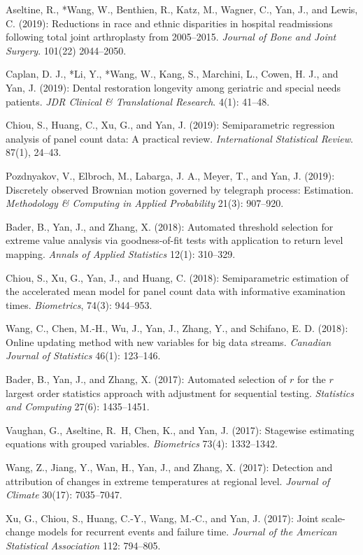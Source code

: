 \documentclass[Statistics]{vita}
\begin{document}
\begin{vita}
\begin{Publications}
\begin{RefereedJournalArticles}
  \item Aseltine, R., *Wang, W., Benthien, R., Katz, M., Wagner, C., Yan, J., and Lewis, C. (2019): Reductions in race and ethnic disparities in hospital readmissions following total joint arthroplasty from 2005--2015. {\em Journal of Bone and Joint Surgery\/}. 101(22) 2044--2050. 
 \item Caplan, D. J., *Li, Y., *Wang, W., Kang, S., Marchini, L., Cowen, H. J., and Yan, J. (2019): Dental restoration longevity among geriatric and special needs patients. {\em JDR Clinical \& Translational Research\/}. 4(1): 41--48.
  \item Chiou, S., Huang, C., Xu, G., and Yan, J. (2019): Semiparametric regression analysis of panel count data: A practical review. {\em International Statistical Review\/}. 87(1), 24--43.
  \item Pozdnyakov, V., Elbroch, M., Labarga, J. A., Meyer, T., and Yan, J. (2019): Discretely observed Brownian motion governed by telegraph process: Estimation. {\em Methodology \& Computing in Applied Probability\/} 21(3): 907--920.
  \item *Bader, B., Yan, J., and Zhang, X. (2018): Automated threshold selection for extreme value analysis via goodness-of-fit tests with application to return level mapping. {\em Annals of Applied Statistics\/} 12(1): 310--329.
  \item Chiou, S., Xu, G., Yan, J., and Huang, C. (2018): Semiparametric estimation of the accelerated mean model for panel count data with informative examination times. {\em Biometrics\/}, 74(3): 944--953.
  \item *Wang, C., Chen, M.-H., Wu, J., Yan, J., Zhang, Y., and Schifano, E. D. (2018): Online updating method with new variables for big data streams. {\em Canadian Journal of Statistics\/} 46(1): 123--146.
 \item *Bader, B., Yan, J., and Zhang, X. (2017): Automated selection of $r$ for the $r$ largest order statistics approach with adjustment for sequential testing. {\em Statistics and Computing\/} 27(6): 1435--1451.
  \item *Vaughan, G., Aseltine, R.~H, Chen, K., and Yan, J. (2017): Stagewise estimating equations with grouped variables. {\em Biometrics\/} 73(4): 1332--1342.
  \item *Wang, Z., Jiang, Y., Wan, H., Yan, J., and Zhang, X. (2017): Detection and attribution of changes in extreme temperatures at regional level.  {\em Journal of Climate\/} 30(17): 7035--7047.
  \item Xu, G., Chiou, S., Huang, C.-Y., Wang, M.-C., and Yan, J. (2017): Joint scale-change models for recurrent events and failure time. {\em Journal of the American Statistical Association\/} 112: 794--805.

\end{RefereedJournalArticles}
\end{Publications}
\end{vita}
\end{document}
